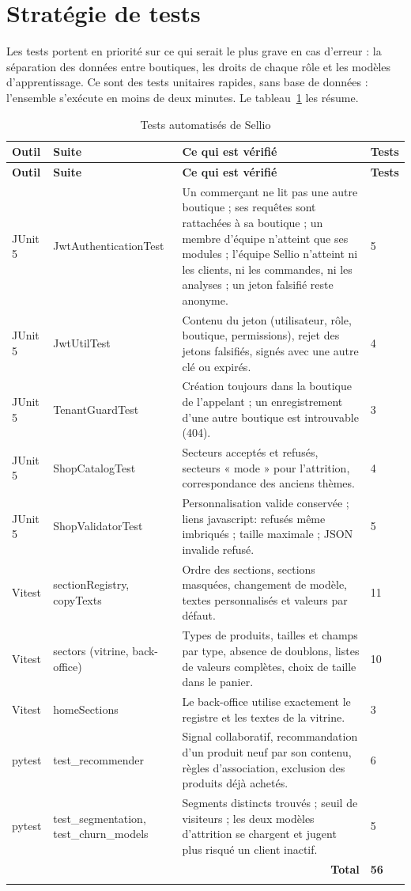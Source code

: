 \section{Stratégie de tests}
Les tests portent en priorité sur ce qui serait le plus grave en cas d'erreur : la séparation des données entre boutiques, les droits de chaque rôle et les modèles d'apprentissage. Ce sont des tests unitaires rapides, sans base de données : l'ensemble s'exécute en moins de deux minutes. Le tableau~\ref{tab:tests} les résume.
\begin{longtable}{|p{2.4cm}|p{4.2cm}|p{7cm}|p{1.2cm}|}
\hline
\textbf{Outil} & \textbf{Suite} & \textbf{Ce qui est vérifié} & \textbf{Tests} \\
\hline
\endfirsthead
\hline
\textbf{Outil} & \textbf{Suite} & \textbf{Ce qui est vérifié} & \textbf{Tests} \\
\hline
\endhead
JUnit 5 & JwtAuthenticationTest & Un commerçant ne lit pas une autre boutique ; ses requêtes sont rattachées à sa boutique ; un membre d'équipe n'atteint que ses modules ; l'équipe Sellio n'atteint ni les clients, ni les commandes, ni les analyses ; un jeton falsifié reste anonyme. & 5 \\
\hline
JUnit 5 & JwtUtilTest & Contenu du jeton (utilisateur, rôle, boutique, permissions), rejet des jetons falsifiés, signés avec une autre clé ou expirés. & 4 \\
\hline
JUnit 5 & TenantGuardTest & Création toujours dans la boutique de l'appelant ; un enregistrement d'une autre boutique est introuvable (404). & 3 \\
\hline
JUnit 5 & ShopCatalogTest & Secteurs acceptés et refusés, secteurs « mode » pour l'attrition, correspondance des anciens thèmes. & 4 \\
\hline
JUnit 5 & ShopValidatorTest & Personnalisation valide conservée ; liens javascript: refusés même imbriqués ; taille maximale ; JSON invalide refusé. & 5 \\
\hline
Vitest & sectionRegistry, copyTexts & Ordre des sections, sections masquées, changement de modèle, textes personnalisés et valeurs par défaut. & 11 \\
\hline
Vitest & sectors (vitrine, back-office) & Types de produits, tailles et champs par type, absence de doublons, listes de valeurs complètes, choix de taille dans le panier. & 10 \\
\hline
Vitest & homeSections & Le back-office utilise exactement le registre et les textes de la vitrine. & 3 \\
\hline
pytest & test\_recommender & Signal collaboratif, recommandation d'un produit neuf par son contenu, règles d'association, exclusion des produits déjà achetés. & 6 \\
\hline
pytest & test\_segmentation, test\_churn\_models & Segments distincts trouvés ; seuil de visiteurs ; les deux modèles d'attrition se chargent et jugent plus risqué un client inactif. & 5 \\
\hline
\multicolumn{3}{|r|}{\textbf{Total}} & \textbf{56} \\
\hline
\caption{Tests automatisés de Sellio}
\label{tab:tests}
\end{longtable}

